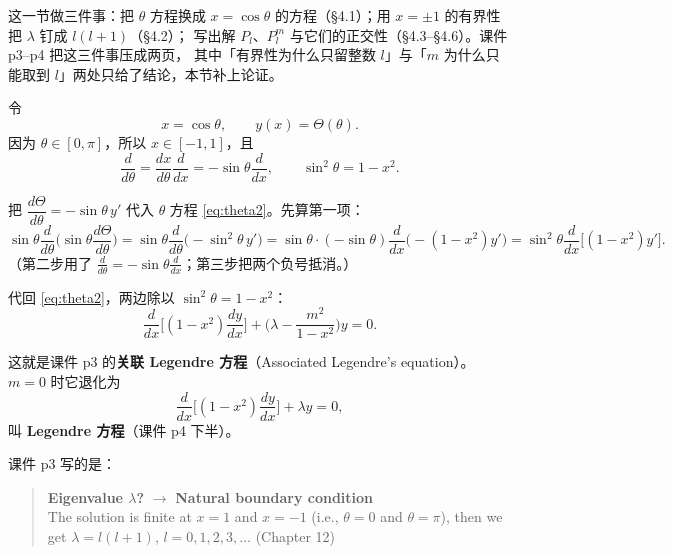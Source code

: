 \label{sec:s4}

这一节做三件事：把 $\theta$ 方程换成 $x=\cos\theta$ 的方程（\S4.1）；用 $x=\pm1$ 的有界性把 $\lambda$ 钉成 $l(l+1)$（\S4.2）；
写出解 $P_l$、$P_l^m$ 与它们的正交性（\S4.3--\S4.6）。课件 p3--p4 把这三件事压成两页，
其中「有界性为什么只留整数 $l$」与「$m$ 为什么只能取到 $l$」两处只给了结论，本节补上论证。


令
\[
x=\cos\theta,\qquad y(x)=\Theta(\theta).
\]
因为 $\theta\in[0,\pi]$，所以 $x\in[-1,1]$，且
\[
\frac{d}{d\theta}=\frac{dx}{d\theta}\frac{d}{dx}=-\sin\theta\frac{d}{dx},
\qquad \sin^2\theta=1-x^2 .
\]

把 $\dfrac{d\Theta}{d\theta}=-\sin\theta\,y'$ 代入 $\theta$ 方程 \eqref{eq:theta2}。先算第一项：
\[
\sin\theta\frac{d}{d\theta}\Big(\sin\theta\frac{d\Theta}{d\theta}\Big)
=\sin\theta\frac{d}{d\theta}\Big(-\sin^2\theta\,y'\Big)
=\sin\theta\cdot(-\sin\theta)\frac{d}{dx}\Big(-(1-x^2)y'\Big)
=\sin^2\theta\frac{d}{dx}\Big[(1-x^2)y'\Big].
\]
（第二步用了 $\frac{d}{d\theta}=-\sin\theta\frac{d}{dx}$；第三步把两个负号抵消。）

代回 \eqref{eq:theta2}，两边除以 $\sin^2\theta=1-x^2$：
\begin{equation}
\frac{d}{dx}\Big[(1-x^2)\frac{dy}{dx}\Big]+\Big(\lambda-\frac{m^2}{1-x^2}\Big)y=0 .
\label{eq:assoc}
\end{equation}

这就是课件 p3 的\textbf{关联 Legendre 方程}（Associated Legendre's equation）。$m=0$ 时它退化为
\begin{equation}
\frac{d}{dx}\Big[(1-x^2)\frac{dy}{dx}\Big]+\lambda y=0 ,
\label{eq:legendre}
\end{equation}
叫 \textbf{Legendre 方程}（课件 p4 下半）。



课件 p3 写的是：

\begin{quote}
\textbf{Eigenvalue $\lambda$?} $\to$ \textbf{Natural boundary condition}\\
The solution is finite at $x=1$ and $x=-1$ (i.e., $\theta=0$ and $\theta=\pi$), then we get
$\lambda=l(l+1)$, $l=0,1,2,3,\dots$ \quad (Chapter 12)
\end{quote}

